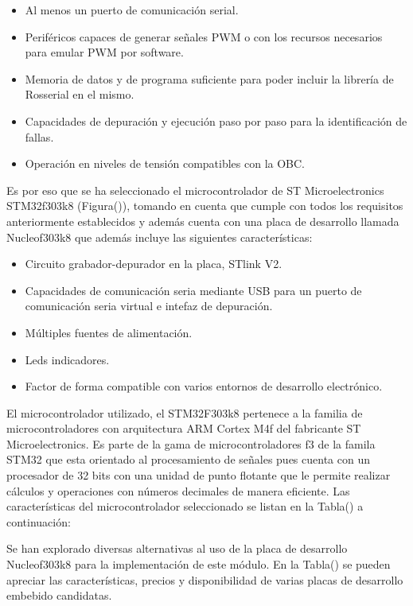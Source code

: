     \begin{itemize}
        \item Al menos un puerto de comunicación serial.
        \item Periféricos capaces de generar señales PWM o con los recursos necesarios para emular PWM por software.
        \item Memoria de datos y de programa suficiente para poder incluir la librería de Rosserial en el mismo.
        \item Capacidades de depuración y ejecución paso por paso para la identificación de fallas.
        \item Operación en niveles de tensión compatibles con la OBC.
    \end{itemize}

    Es por eso que se ha seleccionado el microcontrolador de ST Microelectronics STM32f303k8 (Figura()), tomando en cuenta 
    que cumple con todos los requisitos anteriormente establecidos y además cuenta con una placa de desarrollo llamada 
    Nucleof303k8 que además incluye las siguientes características:

    \begin{itemize}
        \item Circuito grabador-depurador en la placa, STlink V2.
        \item Capacidades de comunicación seria mediante USB para un puerto de comunicación seria virtual e intefaz de depuración.
        \item Múltiples fuentes de alimentación.
        \item Leds indicadores.
        \item Factor de forma compatible con varios entornos de desarrollo electrónico.
    \end{itemize}

    El microcontrolador utilizado, el STM32F303k8 pertenece a la familia de microcontroladores con arquitectura ARM Cortex M4f del 
    fabricante ST Microelectronics. Es parte de la gama de microcontroladores f3 de la famila STM32 que esta orientado al procesamiento 
    de señales pues cuenta con un procesador de 32 bits con una unidad de punto flotante que le permite realizar cálculos y operaciones 
    con números decimales de manera eficiente. Las características del microcontrolador seleccionado se listan en la Tabla() a continuación:

    Se han explorado diversas alternativas al uso de la placa de desarrollo Nucleof303k8 para la implementación de este módulo. En 
    la Tabla() se pueden apreciar las características, precios y disponibilidad de varias placas de desarrollo embebido candidatas.

